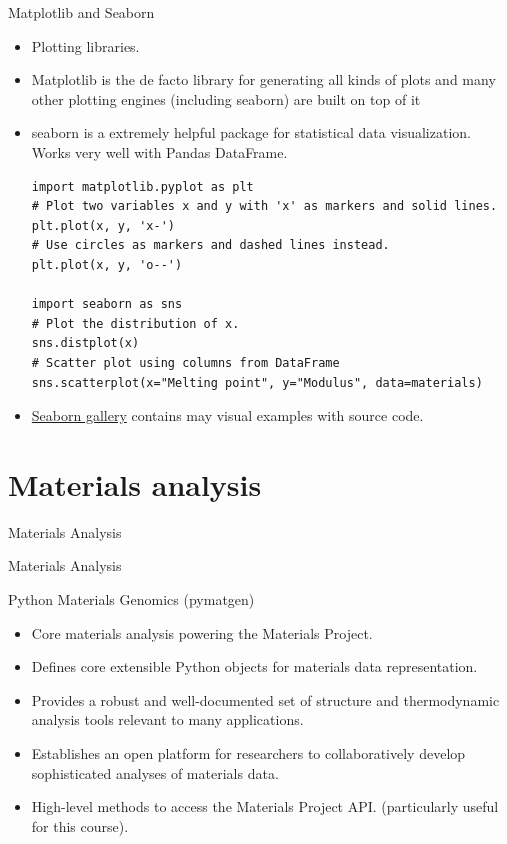 \documentclass[aspectratio=169]{beamer}
\begin{document}
\begin{frame}[fragile]{Matplotlib and Seaborn}
    \begin{itemize}
        \item Plotting libraries.
        \item Matplotlib is the de facto library for generating all kinds of plots and many other plotting engines (including seaborn) are built on top of it
        \item seaborn is a extremely helpful package for statistical data visualization. Works very well with Pandas DataFrame.
        \begin{lstlisting}
import matplotlib.pyplot as plt
# Plot two variables x and y with 'x' as markers and solid lines.
plt.plot(x, y, 'x-')
# Use circles as markers and dashed lines instead.
plt.plot(x, y, 'o--')

import seaborn as sns
# Plot the distribution of x.
sns.distplot(x)
# Scatter plot using columns from DataFrame
sns.scatterplot(x="Melting point", y="Modulus", data=materials)
        \end{lstlisting}
        \item \href{http://seaborn.pydata.org/examples/index.html}{Seaborn gallery} contains may visual examples with source code. 
    \end{itemize}
\end{frame} 


\section{Materials analysis}

\begin{frame}{Materials Analysis}
    \Huge{\centerline{Materials Analysis}}
\end{frame} 

\begin{frame}{Python Materials Genomics (pymatgen)}
    \begin{itemize}
        \item Core materials analysis powering the Materials Project.\cite{ongPythonMaterialsGenomics2013}
        \item Defines core extensible Python objects for materials data representation.
        \item Provides a robust and well-documented set of structure and thermodynamic analysis tools relevant to many applications.
        \item Establishes an open platform for researchers to collaboratively develop sophisticated analyses of materials data.
        \item High-level methods to access the Materials Project API.\cite{ongMaterialsApplicationProgramming2015} (particularly useful for this course).
    \end{itemize}
\end{frame}
\end{document}
